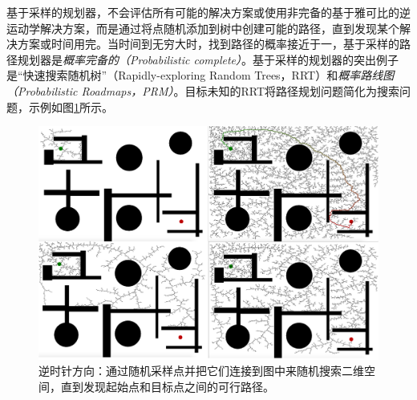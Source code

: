 基于采样的规划器，不会评估所有可能的解决方案或使用非完备的基于雅可比的逆运动学解决方案，而是通过将点随机添加到树中创建可能的路径，直到发现某个解决方案或时间用完。当时间到无穷大时，找到路径的概率接近于一，基于采样的路径规划器是\emph{概率完备的（Probabilistic complete）}。基于采样的规划器的突出例子是“快速搜索随机树”（Rapidly-exploring Random Trees，RRT）\cite{lavalle1998rapidly}和\emph{概率路线图（Probabilistic Roadmaps，PRM）}\cite{kavraki1996probabilistic}。目标未知的RRT将路径规划问题简化为搜索问题，示例如图\ref{fig:rrt}所示。

\begin{figure}
\centering
\includegraphics[width=\textwidth]{figs/irrt}
\caption{逆时针方向：通过随机采样点并把它们连接到图中来随机搜索二维空间，直到发现起始点和目标点之间的可行路径。\label{fig:rrt}}
\end{figure}



